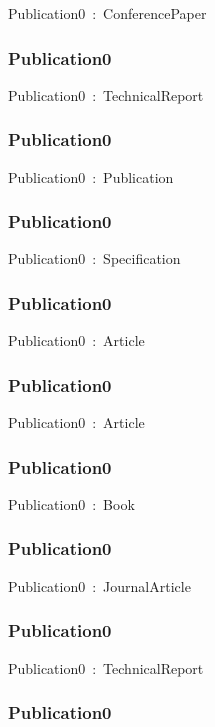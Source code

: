 \documentclass{article}
\begin{document}
Publication0~:~ConferencePaper

\subsubsection*{Publication0}

Publication0~:~TechnicalReport

\subsubsection*{Publication0}

Publication0~:~Publication

\subsubsection*{Publication0}

Publication0~:~Specification

\subsubsection*{Publication0}

Publication0~:~Article

\subsubsection*{Publication0}

Publication0~:~Article

\subsubsection*{Publication0}

Publication0~:~Book

\subsubsection*{Publication0}

Publication0~:~JournalArticle

\subsubsection*{Publication0}

Publication0~:~TechnicalReport

\subsubsection*{Publication0}
\end{document}
